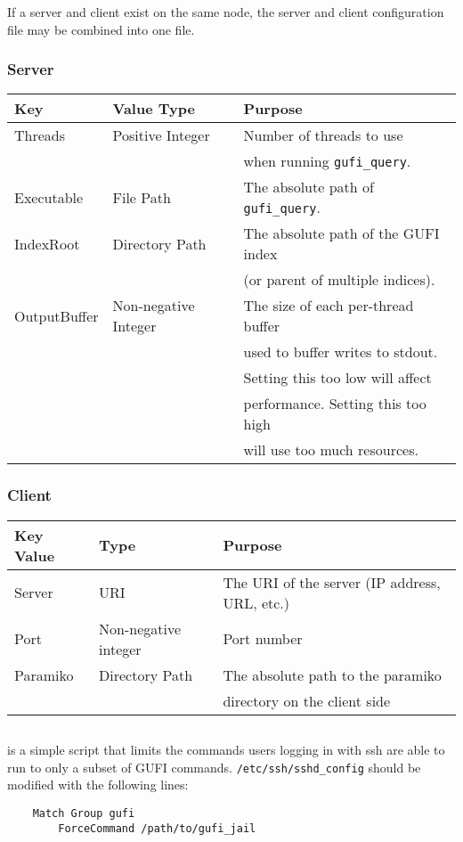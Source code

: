 If a server and client exist on the same node, the server and client
configuration file may be combined into one file.

\subsubsection{Server}
\begin{tabular}{| l | l | l |}
  \hline
  Key & Value Type & Purpose \\
  \hline
  Threads & Positive Integer & Number of threads to use \\
  & & when running \texttt{gufi\_query}. \\
  \hline
  Executable & File Path & The absolute path of \texttt{gufi\_query}. \\
  \hline
  IndexRoot & Directory Path & The absolute path of the GUFI index \\
  & & (or parent of multiple indices). \\
  \hline
  OutputBuffer & Non-negative Integer & The size of each per-thread
  buffer \\
  & & used to buffer writes to stdout. \\
  & & Setting this too low will affect \\
  & & performance. Setting this too high \\
  & & will use too much resources. \\
  \hline
\end{tabular}

\subsubsection{Client}
\begin{tabular}{| l | l | l |}
  \hline
  Key Value & Type & Purpose \\
  \hline
  Server & URI & The URI of the server (IP address, URL, etc.) \\
  \hline
  Port & Non-negative integer & Port number \\
  \hline
  Paramiko & Directory Path & The absolute path to the paramiko \\
  & & directory on the client side \\
  \hline
\end{tabular}

\subsection{\gufijail}
\label{sec:gufi_jail}
\gufijail is a simple script that limits the commands users logging in
with ssh are able to run to only a subset of GUFI
commands. \texttt{/etc/ssh/sshd\_config} should be modified with the
following lines:

\begin{verbatim}
    Match Group gufi
        ForceCommand /path/to/gufi_jail
\end{verbatim}
